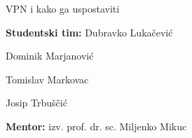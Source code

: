 \begin{titlepage}
	 \thispagestyle{empty}
	 \vspace*{5\baselineskip}
	 \centerline{\huge VPN i kako ga uspostaviti}
	 \vspace*{3\baselineskip}
	 \centerline{\Large \textbf{Studentski tim:} Dubravko Lukačević }
	 \centerline{\hspace{4.7cm} \Large Dominik Marjanović }
	 \centerline{\hspace*{4.5cm} \Large Tomislav Markovac }
	 \centerline{\hspace{3.1cm} \Large Josip Trbuščić}
	 \vspace*{4\baselineskip}
	 \centerline{\Large \textbf{Mentor:} izv. prof. dr. sc. Miljenko Mikuc}
\end{titlepage}

